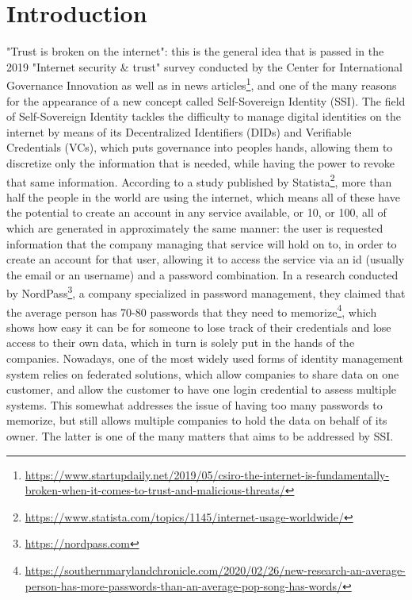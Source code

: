 \section{Introduction}
\label{sec:introduction}


"Trust is broken on the internet": this is the general idea that is passed in the 2019 "Internet security \& trust" survey conducted by the Center for International Governance Innovation \cite{centre2019cigi} as well as in news articles\footnote{\url{https://www.startupdaily.net/2019/05/csiro-the-internet-is-fundamentally-broken-when-it-comes-to-trust-and-malicious-threats/}}, and one of the many reasons for the appearance of a new concept called Self-Sovereign Identity (SSI). 
The field of Self-Sovereign Identity tackles the difficulty to manage digital identities on the internet by means of its Decentralized Identifiers (DIDs) and Verifiable Credentials (VCs), which puts governance into peoples hands, allowing them to discretize only the information that is needed, while having the power to revoke that same information. According to a study published by Statista\footnote{\url{https://www.statista.com/topics/1145/internet-usage-worldwide/}}, more than half the people in the world are using the internet, which means all of these have the potential to create an account in any service available, or 10, or 100, all of which are generated in approximately the same manner: the user is requested information that the company managing that service will hold on to, in order to create an account for that user, allowing it to access the service via an id (usually the email or an username) and a password combination. In a research conducted by NordPass\footnote{\url{https://nordpass.com}}, a company specialized in password management, they claimed that the average person has 70-80 passwords that they need to memorize\footnote{\url{https://southernmarylandchronicle.com/2020/02/26/new-research-an-average-person-has-more-passwords-than-an-average-pop-song-has-words/}}, which shows how easy it can be for someone to lose track of their credentials and lose access to their own data, which in turn is solely put in the hands of the companies. Nowadays, one of the most widely used forms of identity management system relies on federated solutions, which allow companies to share data on one customer, and allow the customer to have one login credential to assess multiple systems. This somewhat addresses the issue of having too many passwords to memorize, but still allows multiple companies to hold the data on behalf of its owner. The latter is one of the many matters that aims to be addressed by SSI.

